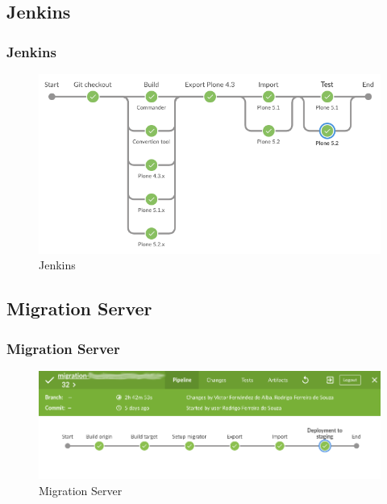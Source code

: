 \documentclass[aspectratio=169]{beamer}
\begin{document}
\subsection{Jenkins}
\begin{frame}
  \frametitle{Jenkins}
  \begin{figure}
    \includegraphics[height=.7\textheight]{./src/img/007_-_Jenkins.png}
    \caption{Jenkins}
  \end{figure}
\end{frame}

\subsection{Migration Server}
\begin{frame}
  \frametitle{Migration Server}
  \begin{figure}
    \includegraphics[width=\textwidth]{./src/img/008_-_Migration.png}
    \caption{Migration Server}
  \end{figure}
\end{frame}

\end{document}
